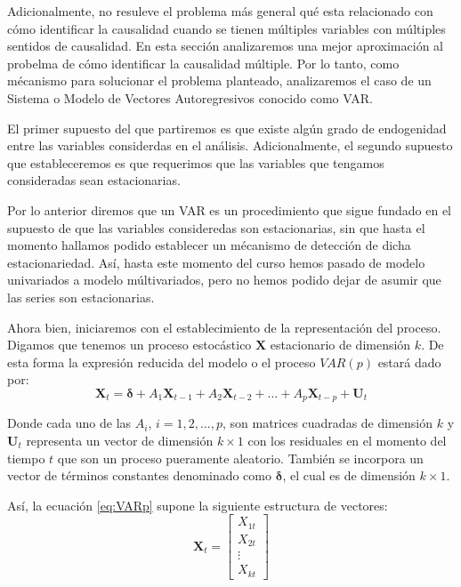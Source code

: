 \documentclass[
]{book}
\begin{document}
Adicionalmente, no resuleve el problema más general qué esta relacionado con cómo identificar la causalidad cuando se tienen múltiples variables con múltiples sentidos de causalidad. En esta sección analizaremos una mejor aproximación al probelma de cómo identificar la causalidad múltiple. Por lo tanto, como mécanismo para solucionar el problema planteado, analizaremos el caso de un Sistema o Modelo de Vectores Autoregresivos conocido como VAR.

El primer supuesto del que partiremos es que existe algún grado de endogenidad entre las variables considerdas en el análisis. Adicionalmente, el segundo supuesto que estableceremos es que requerimos que las variables que tengamos consideradas sean estacionarias.

Por lo anterior diremos que un VAR es un procedimiento que sigue fundado en el supuesto de que las variables consideredas son estacionarias, sin que hasta el momento hallamos podido establecer un mécanismo de detección de dicha estacionariedad. Así, hasta este momento del curso hemos pasado de modelo univariados a modelo múltivariados, pero no hemos podido dejar de asumir que las series son estacionarias.

Ahora bien, iniciaremos con el establecimiento de la representación del proceso. Digamos que tenemos un proceso estocástico \(\mathbf{X}\) estacionario de dimensión \(k\). De esta forma la expresión reducida del modelo o el proceso \(VAR(p)\) estará dado por:
\begin{equation}
    \mathbf{X}_t = \mathbf{\delta} + A_1 \mathbf{X}_{t-1} + A_2 \mathbf{X}_{t-2} + \ldots + A_p \mathbf{X}_{t-p} + \mathbf{U}_{t}
    \label{eq:VARp}
\end{equation}

Donde cada uno de las \(A_i\), \(i = 1, 2, \ldots, p\), son matrices cuadradas de dimensión \(k\) y \(\mathbf{U}_t\) representa un vector de dimensión \(k \times 1\) con los residuales en el momento del tiempo \(t\) que son un proceso pueramente aleatorio. También se incorpora un vector de términos constantes denominado como \(\mathbf{\delta}\), el cual es de dimensión \(k \times 1\).

Así, la ecuación \eqref{eq:VARp} supone la siguiente estructura de vectores:
\begin{equation*}
    \mathbf{X}_t = 
    \begin{bmatrix}
    X_{1t} \\ X_{2t} \\ \vdots \\ X_{kt}
    \end{bmatrix}
\end{equation*}
\end{document}
